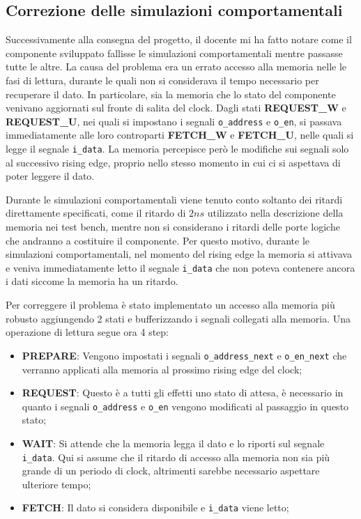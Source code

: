 \subsection{Correzione delle simulazioni comportamentali}

Successivamente alla consegna del progetto, il docente mi ha fatto notare come il componente sviluppato fallisse le simulazioni comportamentali mentre passasse tutte le altre. La causa del problema era un errato accesso alla memoria nelle le fasi di lettura, durante le quali non si considerava il tempo necessario per recuperare il dato. In particolare, sia la memoria che lo stato del componente venivano aggiornati sul fronte di salita del clock. Dagli stati \textbf{REQUEST\_W} e \textbf{REQUEST\_U}, nei quali si impostano i segnali \verb|o_address| e \verb|o_en|, si passava immediatamente alle loro controparti \textbf{FETCH\_W} e \textbf{FETCH\_U}, nelle quali si legge il segnale \verb|i_data|. La memoria percepisce però le modifiche sui segnali solo al successivo rising edge, proprio nello stesso momento in cui ci si aspettava di poter leggere il dato.

Durante le simulazioni comportamentali viene tenuto conto soltanto dei ritardi direttamente specificati, come il ritardo di $2ns$ utilizzato nella descrizione della memoria nei test bench, mentre non si considerano i ritardi delle porte logiche che andranno a costituire il componente. Per questo motivo, durante le simulazioni comportamentali, nel momento del rising edge la memoria si attivava e veniva immediatamente letto il segnale \verb|i_data| che non poteva contenere ancora i dati siccome la memoria ha un ritardo.

Per correggere il problema è stato implementato un accesso alla memoria più robusto aggiungendo 2 stati e bufferizzando i segnali collegati alla memoria. Una operazione di lettura segue ora 4 step:

\begin{itemize}
    \item \textbf{PREPARE}: Vengono impostati i segnali \verb|o_address_next| e \verb|o_en_next| che verranno applicati alla memoria al prossimo rising edge del clock;
    \item \textbf{REQUEST}: Questo è a tutti gli effetti uno stato di attesa, è necessario in quanto i segnali \verb|o_address| e \verb|o_en| vengono modificati al passaggio in questo stato;
    \item \textbf{WAIT}: Si attende che la memoria legga il dato e lo riporti sul segnale \verb|i_data|. Qui si assume che il ritardo di accesso alla memoria non sia più grande di un periodo di clock, altrimenti sarebbe necessario aspettare ulteriore tempo;
    \item \textbf{FETCH}: Il dato si considera disponibile e \verb|i_data| viene letto;
\end{itemize}

